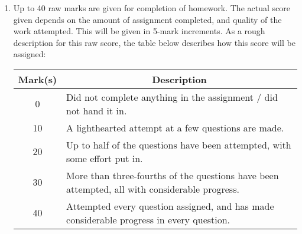 \documentclass{amsart}
\theoremstyle{definition}
\theoremstyle{definition}
\DeclareMathOperator{\1}{\mathbbm{1}}
\begin{document}
	
	\begin{enumerate}[itemsep=.75em]
		
		
		\item Up to 40 raw marks are given for completion of homework. The actual score given depends on the amount of assignment completed, and quality of the work attempted. This will be given in 5-mark increments. As a rough description for this raw score, the table below describes how this score will be assigned:
		
		\begin{center}
			\begin{tabular}{c | p{9cm}}
				\textbf{Mark(s)} & \multicolumn{1}{c}{\textbf{Description}} \\
				\hline
				0 & Did not complete anything in the assignment / did not hand it in. \\
				\hline
				10 & A lighthearted attempt at a few questions are made. \\
				\hline
				20 & Up to half of the questions have been attempted, with some effort put in. \\
				\hline
				30 & More than three-fourths of the questions have been attempted, all with considerable progress. \\
				\hline
				40 & Attempted every question assigned, and has made considerable progress in every question.
			\end{tabular}
		\end{center}
		
		

\end{enumerate}
\end{document}
